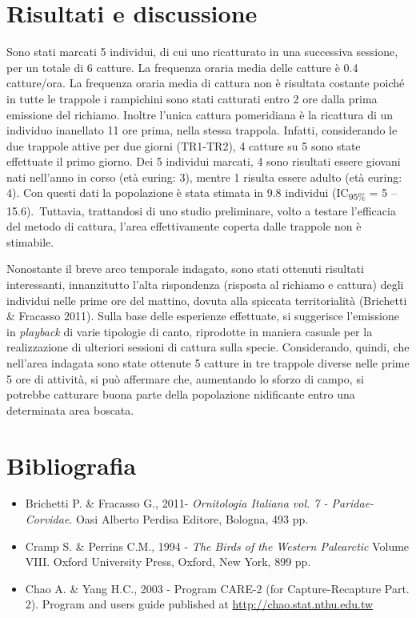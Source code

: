\section*{Risultati e discussione}
Sono stati marcati 5 individui, di cui uno ricatturato in una successiva
sessione, per un totale di 6 catture. La frequenza oraria media delle
catture \`e 0.4 catture/ora. La frequenza oraria media di cattura non
\`e risultata costante poich\'e in tutte le trappole i rampichini sono
stati catturati entro 2 ore dalla prima emissione del richiamo. Inoltre
l{\textquoteright}unica cattura pomeridiana \`e la ricattura di un
individuo inanellato 11 ore prima, nella stessa trappola. Infatti,
considerando le due trappole attive per due giorni (TR1-TR2), 4 catture
su 5 sono state effettuate il primo giorno. Dei 5 individui marcati, 4
sono risultati essere giovani nati nell{\textquoteright}anno in corso
(et\`a euring: 3), mentre 1 risulta essere adulto (et\`a euring: 4).
Con questi dati la popolazione \`e stata stimata in 9.8 individui
(IC\textsubscript{95\%} = 5 -- 15.6).~Tuttavia, trattandosi di uno
studio preliminare, volto a testare l{\textquoteright}efficacia del
metodo di cattura, l{\textquoteright}area effettivamente coperta dalle
trappole non \`e stimabile.

Nonostante il breve arco temporale indagato, sono stati ottenuti
risultati interessanti, innanzitutto l{\textquoteright}alta rispondenza
(risposta al richiamo e cattura) degli individui nelle prime ore del
mattino, dovuta alla spiccata territorialit\`a (Brichetti \& Fracasso
2011).  Sulla base delle esperienze effettuate, si suggerisce
l{\textquoteright}emissione in \textit{playback} di varie tipologie di
canto, riprodotte in maniera casuale per la realizzazione di ulteriori
sessioni di cattura sulla specie. Considerando, quindi, che
nell{\textquoteright}area indagata sono state ottenute 5 catture in tre
trappole diverse nelle prime 5 ore di attivit\`a, si pu\`o affermare
che, aumentando lo sforzo di campo, si potrebbe catturare buona parte
della popolazione nidificante entro una determinata area boscata.

\section*{Bibliografia}
\begin{itemize}\itemsep0pt
\item {
Brichetti P. \& Fracasso G., 2011- \textit{Ornitologia Italiana vol. 7 -
Paridae-Corvidae}. Oasi Alberto Perdisa Editore, Bologna, 493 pp.}

	\item {
Cramp S. \& Perrins C.M., 1994 - \textit{The Birds of the Western
Palearctic} Volume VIII. Oxford University Press, Oxford, New York, 899
pp. }

	\item {
Chao A. \& Yang H.C., 2003 - Program CARE-2 (for Capture-Recapture Part.
2). Program and user{\textquotesingle}s guide published at
\url{http://chao.stat.nthu.edu.tw}}
\end{itemize}
